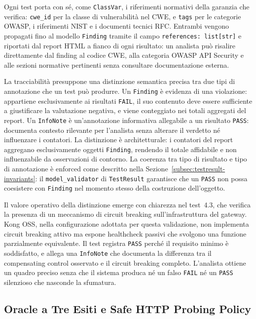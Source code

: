 Ogni test porta con sé, come \texttt{ClassVar}, i riferimenti normativi della garanzia che verifica: \texttt{cwe\_id} per la classe di vulnerabilità nel \gls{CWE}, e \texttt{tags} per le categorie \gls{OWASP}, i riferimenti \gls{NIST} e i documenti tecnici \gls{RFC}. Entrambi vengono propagati fino al modello \texttt{Finding} tramite il campo \texttt{references: list[str]} e riportati dal report HTML a fianco di ogni risultato: un analista può risalire direttamente dal finding al codice \gls{CWE}, alla categoria \gls{OWASP} API Security e alle sezioni normative pertinenti senza consultare documentazione esterna.

La tracciabilità presuppone una distinzione semantica precisa tra due tipi di annotazione che un test può produrre. Un \texttt{Finding} è evidenza di una violazione: appartiene esclusivamente ai risultati \texttt{FAIL}, il suo contenuto deve essere sufficiente a giustificare la valutazione negativa, e viene conteggiato nei totali aggregati del report. Un \texttt{InfoNote} è un'annotazione informativa allegabile a un risultato \texttt{PASS}: documenta contesto rilevante per l'analista senza alterare il verdetto né influenzare i contatori. La distinzione è architetturale: i contatori del report aggregano esclusivamente oggetti \texttt{Finding}, rendendo il totale affidabile e non influenzabile da osservazioni di contorno. La coerenza tra tipo di risultato e tipo di annotazione è enforced come descritto nella Sezione~\ref{subsec:testresult-invariants}: il \texttt{model\_validator} di \texttt{TestResult} garantisce che un \texttt{PASS} non possa coesistere con \texttt{Finding} nel momento stesso della costruzione dell'oggetto.

Il valore operativo della distinzione emerge con chiarezza nel test~4.3, che verifica la presenza di un meccanismo di circuit breaking sull'infrastruttura del gateway. Kong OSS, nella configurazione adottata per questa validazione, non implementa circuit breaking attivo ma espone healthcheck passivi che svolgono una funzione parzialmente equivalente. Il test registra \texttt{PASS} perché il requisito minimo è soddisfatto, e allega una \texttt{InfoNote} che documenta la differenza tra il compensating control osservato e il circuit breaking completo. L'analista ottiene un quadro preciso senza che il sistema produca né un falso \texttt{FAIL} né un \texttt{PASS} silenzioso che nasconde la sfumatura.


\subsection{Oracle a Tre Esiti e Safe HTTP Probing Policy}\label{subsec:probing-policy}

